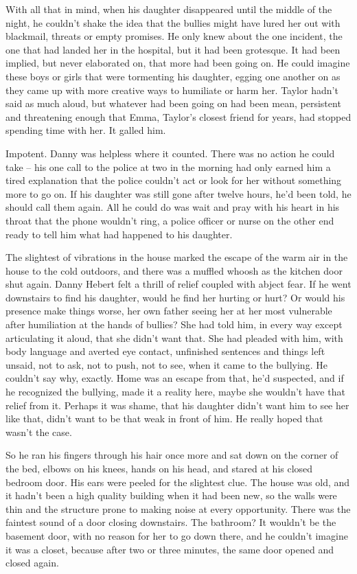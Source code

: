 With all that in mind, when his daughter disappeared until the middle of the night, he couldn't shake the idea that the bullies might have lured her out with blackmail, threats or empty promises. He only knew about the one incident, the one that had landed her in the hospital, but it had been grotesque. It had been implied, but never elaborated on, that more had been going on. He could imagine these boys or girls that were tormenting his daughter, egging one another on as they came up with more creative ways to humiliate or harm her. Taylor hadn't said as much aloud, but whatever had been going on had been mean, persistent and threatening enough that Emma, Taylor's closest friend for years, had stopped spending time with her. It galled him.

Impotent. Danny was helpless where it counted. There was no action he could take -- his one call to the police at two in the morning had only earned him a tired explanation that the police couldn't act or look for her without something more to go on. If his daughter was still gone after twelve hours, he'd been told, he should call them again. All he could do was wait and pray with his heart in his throat that the phone wouldn't ring, a police officer or nurse on the other end ready to tell him what had happened to his daughter.

The slightest of vibrations in the house marked the escape of the warm air in the house to the cold outdoors, and there was a muffled whoosh as the kitchen door shut again. Danny Hebert felt a thrill of relief coupled with abject fear. If he went downstairs to find his daughter, would he find her hurting or hurt? Or would his presence make things worse, her own father seeing her at her most vulnerable after humiliation at the hands of bullies? She had told him, in every way except articulating it aloud, that she didn't want that. She had pleaded with him, with body language and averted eye contact, unfinished sentences and things left unsaid, not to ask, not to push, not to see, when it came to the bullying. He couldn't say why, exactly. Home was an escape from that, he'd suspected, and if he recognized the bullying, made it a reality here, maybe she wouldn't have that relief from it. Perhaps it was shame, that his daughter didn't want him to see her like that, didn't want to be that weak in front of him. He really hoped that wasn't the case.

So he ran his fingers through his hair once more and sat down on the corner of the bed, elbows on his knees, hands on his head, and stared at his closed bedroom door. His ears were peeled for the slightest clue. The house was old, and it hadn't been a high quality building when it had been new, so the walls were thin and the structure prone to making noise at every opportunity. There was the faintest sound of a door closing downstairs. The bathroom? It wouldn't be the basement door, with no reason for her to go down there, and he couldn't imagine it was a closet, because after two or three minutes, the same door opened and closed again.

